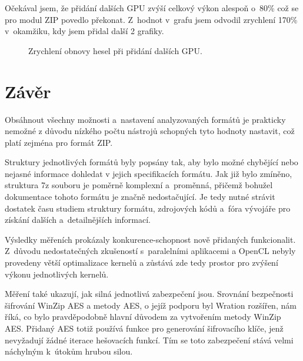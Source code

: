 Očekával jsem, že přidání dalších GPU zvýší celkový výkon alespoň o~80\% což se pro modul ZIP
povedlo překonat. Z~hodnot v~grafu jsem odvodil zrychlení 170\% v~okamžiku, kdy jsem přidal další
2 grafiky.

\begin{figure}[ht]
    \begin{center}
	\caption{Zrychlení obnovy hesel při přidání dalších GPU.}
	\label{memory}
    \end{center}
\end{figure}

\chapter{Závěr}
Obsáhnout všechny možnosti a~nastavení analyzovaných formátů je prakticky nemožné z důvodu nízkého
počtu nástrojů schopných tyto hodnoty nastavit, což platí zejména pro formát ZIP.

 Struktury jednotlivých formátů byly popsány tak, aby bylo možné chybějící nebo nejasné informace
dohledat v jejich specifikacích formátu. Jak již bylo zmíněno, struktura 7z souboru je poměrně
komplexní a~proměnná, přičemž bohužel dokumentace tohoto formátu je značně nedostačující. Je tedy
nutné strávit dostatek času studiem struktury formátu, zdrojových kódů a~fóra vývojáře pro získání dalších a~detailnějších informací.

 Výsledky měřeních prokázaly konkurence-schopnost nově přidaných funkcionalit. Z~důvodu
nedostatečných zkušeností s~paralelními aplikacemi a OpenCL nebyly provedeny větší
optimalizace kernelů a zůstává zde tedy prostor pro zvýšení výkonu jednotlivých kernelů. 

 Měření také ukazují, jak silná jednotlivá zabezpečení jsou. Srovnání bezpečnosti šifrování
WinZip AES a metody AES, o jejíž podporu byl Wration rozšířen, nám říká, co bylo pravděpodobně hlavní
důvodem za vytvořením metody WinZip AES. Přidaný AES totiž používá funkce pro generování
šifrovacího klíče, jenž nevyžadují žádné iterace hešovacích funkcí. Tím se toto zabezpečení stává
velmi náchylným k~útokům hrubou silou.

